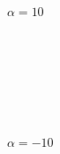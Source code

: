 \documentclass{article}
\begin{document}
\begin{figure}[h!]
\caption*{$ \alpha = 10 $}
\end{figure}\\\\\\\\\\
\begin{figure}[h!]
\caption*{$ \alpha = -10 $}
\end{figure}\\\\
\end{document}
